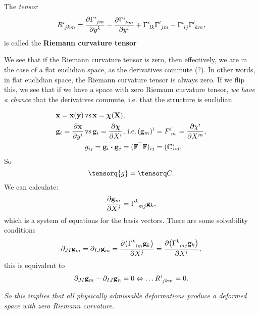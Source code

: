 \documentclass[reqno, a4paper]{article}
\begin{document}
	\begin{definition}
    The \textit{tensor}
    \begin{equation}
R \indices{^i_{jkm}}=\pdv{\Gamma \indices{^i_{jm}}}{y^k} - \pdv{\Gamma \indices{^i_{km}}}{y^i} + \Gamma \indices{^i_{lk}} \Gamma \indices{^l_{jm}}- \Gamma \indices{^i_{lj}} \Gamma \indices{^l_{km}},
    \end{equation}
    is called the \textbf{Riemann curvature tensor}
\end{definition}
We see that if the Riemann curvature tensor is zero, then effectively, we are in the case of a flat euclidian space, as the derivatives commute (?).
In other words, in flat euclidian space, the Riemann curvature tensor is always zero. If we flip this, we see that if we have a space with zero Riemann curvature tensor, \textit{we have a chance} that the derivatives commute, i.e. that the structure is euclidian.

\begin{tcolorbox}
\begin{example}
	\begin{align*}
		\vb{x} = \vb{x}\qty(\vb{y}) \, &\text{vs} \, \vb{x}=\vb*{\chi}\qty(\vb{X}), \\
		\vb{g}_i = \pdv{\vb{x}}{y^i} \, &\text{vs} \, \vb{g}_i = \pdv{\vb*{\chi}}{X^i}, \, \text{i.e.} \, (\vb{g}_m)^i = F \indices{^i_m} = \pdv{\chi^i}{X^m}, \\
												  &	g_{ij}=\vb{g}_i \vdot \vb{g}_j = (\transpose{\fgrad} \fgrad)_{ij}=(\rcg)_{ij}, \\
		\end{align*}
		So
		\begin{equation}
			\label{eq:cauchy_metric}
			\tensorq{g}=\rcg.
		\end{equation}
		We can calculate:
		\[
			\pdv{\vb{g}_m}{X^j} = \Gamma \indices{^k_{mj}}\vb{g}_k,
		\]
		which is a system of equations for the basis vectors. There are some solvability conditions
		\begin{equation*}
			\partial_{JI}\vb{g}_m = \partial_{IJ}\vb{g}_m = \pdv{\qty(\Gamma \indices{^k_{im}} \vb{g}_k)}{X^j} = \pdv{\qty(\Gamma \indices{^k_{mj}} \vb{g}_k)}{X^i} ,
		\end{equation*}
		this is equivalent to 
		\[
			\partial_{JI}\vb{g}_m - \partial_{IJ} \vb{g}_n =0 \Leftrightarrow \dots R \indices{^i_{jkm}} = 0.
		\]
	\end{example}
	\textit{So this implies that all physically admissable deformations produce a deformed space with zero Riemann curvature.}
\end{tcolorbox}
\end{document}

